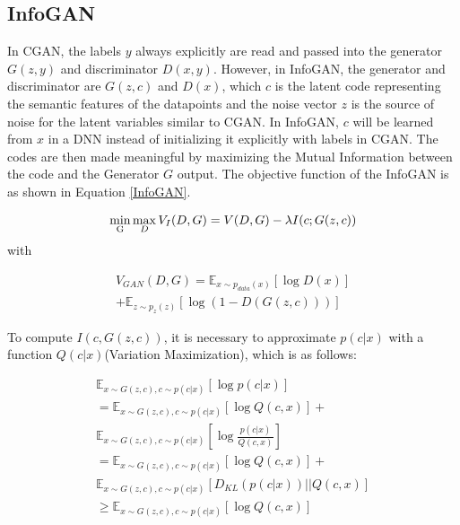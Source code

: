 \documentclass[conference]{IEEEtran}
\begin{document}
\iffalse
\subsection{InfoGAN}
{\color{purple}In CGAN, the labels $y$ always explicitly are read and passed into the generator $G(z,y)$ and discriminator $D(x,y)$. However, in InfoGAN, the generator and discriminator are $G(z,c)$ and $D(x)$, which $c$ is the latent code representing the semantic features of the datapoints and the noise vector $z$ is the source of noise for the latent variables similar to CGAN. In InfoGAN, $c$ will be learned from $x$ in a DNN instead of initializing it explicitly with labels in CGAN. The codes are then made meaningful by maximizing the Mutual Information between the code and the Generator $G$ output. The objective function of the InfoGAN is as shown in Equation \eqref{InfoGAN}.  }

\begin{equation}
\begin{split}
\label{InfoGAN}
\mathop {\min }\limits_{\rm{G}} \mathop {\max }\limits_D V_I(D,G) = V(D,G)-\lambda I(c;G(z,c))
\end{split}
\end{equation}
with

\begin{equation}
\begin{split}
\label{V_InfoGAN}
V_{GAN}(D,G) = \mathbb{E}_{x\sim{p_{data}}(x)}[\log D(x)] \\
+ {\mathbb{E}_{z\sim{p_z}(z)}}[\log (1 - D(G(z,c)))]
\end{split}
\end{equation}

{\color{purple}To compute $I(c,G(z,c))$, it is necessary to approximate $p(c|x)$ with a function $Q(c|x)$(Variation Maximization), which is as follows:}

\begin{equation}
\begin{split}
\label{Variation_Maximization}
\mathbb{E}_{x\sim{G(z,c)},c\sim{p(c|x)}}[\log p(c|x)] \\
= \mathbb{E}_{x\sim{G(z,c)},c\sim{p(c|x)}}[\log Q(c,x)] + \\ \mathbb{E}_{x\sim{G(z,c)},c\sim{p(c|x)}}[\log \frac{p(c|x)}{Q(c,x)}] \\
=  \mathbb{E}_{x\sim{G(z,c)},c\sim{p(c|x)}}[\log Q(c,x)] + \\
\mathbb{E}_{x\sim{G(z,c)},c\sim{p(c|x)}}[{D_{KL}(p(c|x))}||{Q(c,x)}]\\
\geq  \mathbb{E}_{x\sim{G(z,c)},c\sim{p(c|x)}}[\log Q(c,x)] 
\end{split}
\end{equation}
\end{document}
